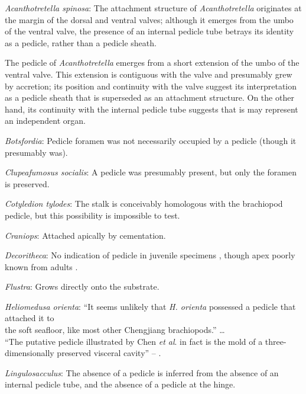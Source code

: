 \documentclass[openany]{book}
\theoremstyle{definition}
\theoremstyle{definition}
\theoremstyle{definition}
\theoremstyle{remark}
\begin{document}
\hypertarget{Acanthotretella_spinosa-coding-24}{}
\emph{Acanthotretella spinosa}: The attachment structure of
\emph{Acanthotretella} originates at the margin of the dorsal and
ventral valves; although it emerges from the umbo of the ventral valve,
the presence of an internal pedicle tube betrays its identity as a
pedicle, rather than a pedicle sheath.

The pedicle of \emph{Acanthotretella} emerges from a short extension of
the umbo of the ventral valve. This extension is contiguous with the
valve and presumably grew by accretion; its position and continuity with
the valve suggest its interpretation as a pedicle sheath that is
superseded as an attachment structure. On the other hand, its continuity
with the internal pedicle tube suggests that is may represent an
independent organ.

\hypertarget{Botsfordia-coding-24}{}
\emph{Botsfordia}: Pedicle foramen was not necessarily occupied by a
pedicle (though it presumably was).

\hypertarget{Clupeafumosus_socialis-coding-24}{}
\emph{Clupeafumosus socialis}: A pedicle was presumably present, but
only the foramen is preserved.

\hypertarget{Cotyledion_tylodes-coding-24}{}
\emph{Cotyledion tylodes}: The stalk is conceivably homologous with the
brachiopod pedicle, but this possibility is impossible to test.

\hypertarget{Craniops-coding-24}{}
\emph{Craniops}: Attached apically by cementation.

\hypertarget{Decoritheca-coding-24}{}
\emph{Decoritheca}: No indication of pedicle in juvenile specimens
\citep{Dzik1980Ontogenyof}, though apex poorly known from adults
\citep{Malinky1987}.

\hypertarget{Flustra-coding-24}{}
\emph{Flustra}: Grows directly onto the substrate.

\hypertarget{Heliomedusa_orienta-coding-24}{}
\emph{Heliomedusa orienta}: ``It seems unlikely that \emph{H. orienta}
possessed a pedicle that attached it to\\
the soft seafloor, like most other Chengjiang brachiopods.'' \ldots{}\\
``The putative pedicle illustrated by Chen \emph{et al}.
\citeyearpar[Figs 4, 6, 7]{Chen2007Reinterpretationof} in fact is the
mold of a three-dimensionally preserved visceral cavity'' --
\citet{Zhang2009Architectureand}.

\hypertarget{Lingulosacculus-coding-24}{}
\emph{Lingulosacculus}: The absence of a pedicle is inferred from the
absence of an internal pedicle tube, and the absence of a pedicle at the
hinge.
\end{document}

